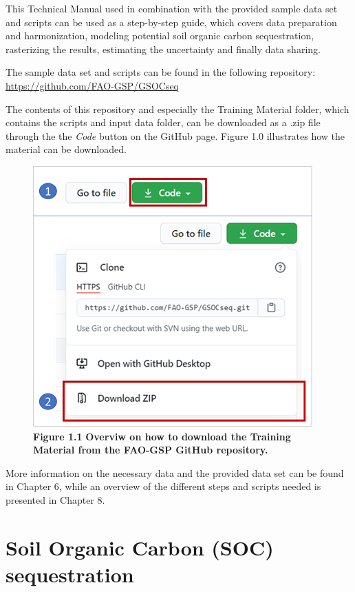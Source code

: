 \documentclass[
  10pt,
  b5paper,
]{book}
\begin{document}
This Technical Manual used in combination with the provided sample data set and scripts can be used as a step-by-step guide, which covers data preparation and harmonization, modeling potential soil organic carbon sequestration, rasterizing the results, estimating the uncertainty and finally data sharing.

The sample data set and scripts can be found in the following repository: \url{https://github.com/FAO-GSP/GSOCseq}

The contents of this repository and especially the Training Material folder, which contains the scripts and input data folder, can be downloaded as a .zip file through the the \emph{Code} button on the GitHub page. Figure 1.0 illustrates how the material can be downloaded.

\begin{figure}
\centering
\includegraphics{images/Figure_1.1.png}
\caption{\textbf{Figure 1.1} \textbf{Overviw on how to download the Training Material from the FAO-GSP GitHub repository.}}
\end{figure}

More information on the necessary data and the provided data set can be found in Chapter 6, while an overview of the different steps and scripts needed is presented in Chapter 8.

\hypertarget{soil-organic-carbon-soc-sequestration}{%
\chapter{\textbar{} Soil Organic Carbon (SOC) sequestration}\label{soil-organic-carbon-soc-sequestration}}
\end{document}
